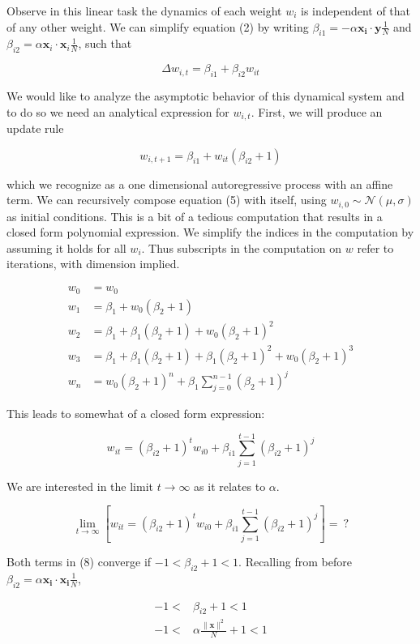 \documentclass[]{article}
\begin{document}
Observe in this linear task the dynamics of each weight \(w_i\) is
independent of that of any other weight. We can simplify equation (2) by
writing \(\beta_ {i1}= - \alpha\mathbf{x_i}\cdot\mathbf{y}\frac{1}{N}\)
and \(\beta_{i2}=\alpha\mathbf{x}_i \cdot\mathbf{x}_i\frac{1}{N}\), such
that

\[
\Delta w_{i,t} = \beta_{i1}+\beta_{i2}w_{it}
\]

We would like to analyze the asymptotic behavior of this dynamical
system and to do so we need an analytical expression for \(w_{i,t}\).
First, we will produce an update rule

\[
w_{i,t+1} = \beta_{i1}+w_{it} (\beta_{i2}+1)
\]

which we recognize as a one dimensional autoregressive process with an
affine term. We can recursively compose equation (5) with itself, using
\(w_{i,0} \sim \mathcal{N}(\mu, \sigma)\) as initial conditions. This is
a bit of a tedious computation that results in a closed form polynomial
expression. We simplify the indices in the computation by assuming it
holds for all \(w_i\). Thus subscripts in the computation on \(w\) refer
to iterations, with dimension implied.

\begin{align}
w_{0} &= w_0\\
w_{1} &= \beta_1+w_0(\beta_2+1)  \\
w_2  &= \beta_1+\beta_1(\beta_2+1)+w_0(\beta_2+1)^2\\
w_3 &= \beta_1 + \beta_1(\beta_2+1)+\beta_1(\beta_2+1)^2+w_0(\beta_2+1)^3\\ 
w_n &=w_0(\beta_2 + 1)^n +  \beta_1\sum^{n-1}_{j=0}(\beta_2+1)^j 
\end{align}

This leads to somewhat of a closed form expression:

\[
w_{it} = (\beta_{i2}+1)^t w_{i0}+\beta_{i1}\sum\limits^{t-1}_{j=1}(\beta_{i2}+1)^j
\]

We are interested in the limit \(t\to \infty\) as it relates to
\(\alpha\).

\[
\lim\limits_{t\to\infty} \left [w_{it} = (\beta_{i2}+1)^t w_{i0}+\beta_{i1}\sum\limits^{t-1}_{j=1}(\beta_{i2}+1)^j \right] =\ ?
\]

Both terms in (8) converge if \(-1 < \beta_{i2}+1 < 1\). Recalling from
before \(\beta_{i2} =\alpha\mathbf{x_i}\cdot\mathbf{x_i}\frac{1}{N}\),

\begin{align}
-1 < &\beta_{i2}+1  <1 \\
-1 < &\alpha\frac{\|\mathbf{x}\|^2}{N} + 1 < 1 \\
\end{align}
\end{document}
